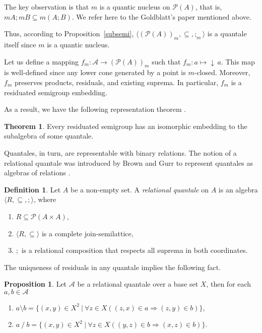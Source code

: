 \documentclass[a4paper]{article}
\theoremstyle{definition}
\newtheorem{definition}{Definition}
\theoremstyle{theorem}
\newtheorem{theorem}{Theorem}
\theoremstyle{proposition}
\newtheorem{proposition}{Proposition}
\theoremstyle{lemma}
\theoremstyle{ex}
\theoremstyle{corollary}
\theoremstyle{claim}
\newcommand{\down}[1]{\ensuremath{{\downarrow}\,#1}}
\begin{document}
The key observation is that $m$ is a quantic nucleus on $\mathcal{P}(A)$, that is, $m A ; m B \subseteq m (A ; B)$. We refer here to the Goldblatt's paper mentioned above.

Thus, according to Proposition~\ref{subsemi}, $\langle (\mathcal{P}(A))_m, \subseteq, ;_m \rangle$ is a quantale itself since $m$ is a quantic nucleus.

Let us define a mapping $f_m : \mathcal{A} \to (\mathcal{P}(A))_m$ such that $f_m : a \mapsto \down{a}$. This map is well-defined since any lower cone generated by a point is $m$-closed. Moreover, $f_m$ preserves products, residuals, and existing suprema. In particular, $f_m$ is a residuated semigroup embedding.

As a result, we have the following representation theorem \cite[Corollary 2]{goldblatt2006kripke}.

\begin{theorem} \label{orsRep}
  Every residuated semigroup has an isomorphic embedding to the subalgebra of some quantale.
\end{theorem}

Quantales, in turn, are representable with binary relations. The notion of a relational quantale was introduced by Brown and Gurr to represent quantales as algebras of relations \cite{brown1993representation}.
\begin{definition}
  Let $A$ be a non-empty set. A \emph{relational quantale} on $A$ is an algebra $\langle R, \subseteq, ; \rangle$, where
  \begin{enumerate}
    \item $R \subseteq \mathcal{P}(A \times A)$,
    \item $\langle R, \subseteq \rangle$ is a complete join-semilattice,
    \item $;$ is a relational composition that respects all suprema in both coordinates.
  \end{enumerate}
\end{definition}

The uniqueness of residuals in any quantale implies the following fact.
\begin{proposition}\label{ok}
  Let $\mathcal{A}$ be a relational quantale over a base set $X$, then for each $a, b \in \mathcal{A}$
  \begin{enumerate}
    \item $a \setminus b = \{ (x, y) \in X^2 \: | \: \forall z \in X ( (z, x) \in a \Rightarrow (z, y) \in b) \}$,
    \item $a \: / \: b = \{ (x, y) \in X^2 \: | \: \forall z \in X ( (y, z) \in b \Rightarrow (x, z) \in b )\}$.
  \end{enumerate}
\end{proposition}
\end{document}
